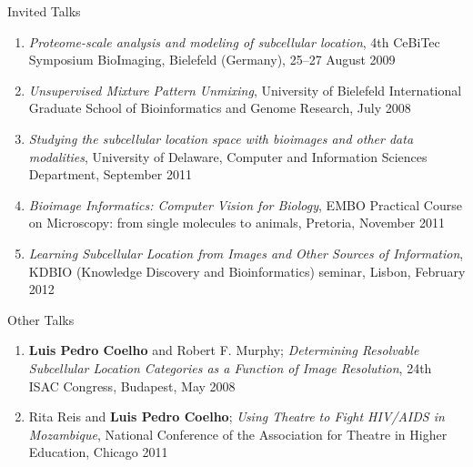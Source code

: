 \documentclass{article}
\renewcommand\subsection[1]{%
    \par\vspace{.1em}%
    {\hspace{1em}\subsubhead #1}%
    \par\vspace{.2em}%
}
\begin{document}
\subsection{Invited Talks}
\begin{enumerate}
\item \emph{Proteome-scale analysis and modeling of subcellular location}, 4th
CeBiTec Symposium BioImaging, Bielefeld (Germany), 25--27 August 2009
\item \emph{Unsupervised Mixture Pattern Unmixing}, University of Bielefeld
International Graduate School of Bioinformatics and Genome Research, July 2008
\item \emph{Studying the subcellular location space with bioimages and other
data modalities}, University of Delaware, Computer and Information Sciences
Department, September 2011
\item \emph{Bioimage Informatics: Computer Vision for Biology}, EMBO Practical
Course on Microscopy: from single molecules to animals, Pretoria, November 2011
\item \emph{Learning Subcellular Location from Images and Other Sources of
Information}, KDBIO (Knowledge Discovery and Bioinformatics) seminar, Lisbon,
February 2012

\end{enumerate}


\subsection{Other Talks}

\begin{enumerate}
\item \textbf{Luis Pedro Coelho} and Robert F. Murphy; \emph{Determining
Resolvable Subcellular Location Categories as a Function of Image Resolution},
24th ISAC Congress, Budapest, May 2008
\item Rita Reis and \textbf{Luis Pedro Coelho}; \emph{Using Theatre to Fight
HIV/AIDS in Mozambique}, National Conference of the Association for Theatre in
Higher Education, Chicago 2011
\end{enumerate}
\end{document}
